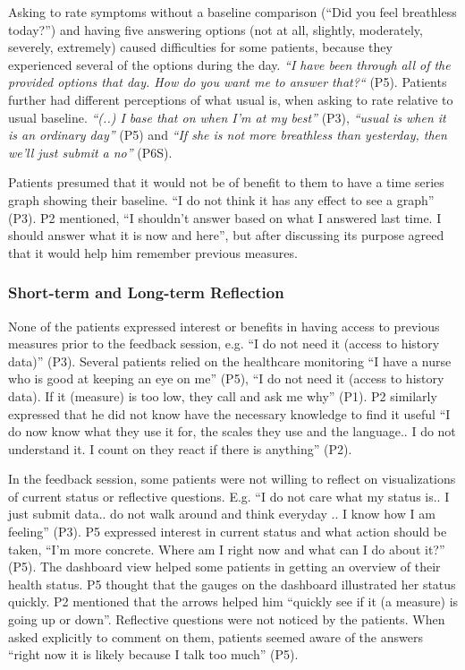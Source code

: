 Asking to rate symptoms without a baseline comparison (“Did you feel breathless today?”) and having five answering options (not at all, slightly, moderately, severely, extremely) caused difficulties for some patients, because they experienced several of the options during the day. \textit{“I have been through all of the provided options that day. How do you want me to answer that?“} (P5). Patients further had different perceptions of what usual is, when asking to rate relative to usual baseline. \textit{“(..) I base that on when I’m at my best”} (P3), \textit{“usual is when it is an ordinary day”} (P5) and \textit{“If she is not more breathless than yesterday, then we’ll just submit a no”} (P6S). 

Patients presumed that it would not be of benefit to them to have a time series graph showing their baseline. “I do not think it has any effect to see a graph” (P3). P2 mentioned, “I shouldn’t answer based on what I answered last time. I should answer what it is now and here”, but after discussing its purpose agreed that it would help him remember previous measures. 

\subsubsection{Short-term and Long-term Reflection}
None of the patients expressed interest or benefits in having access to previous measures prior to the feedback session, e.g. “I do not need it (access to history data)” (P3). Several patients relied on the healthcare monitoring “I have a nurse who is good at keeping an eye on me” (P5), “I do not need it (access to history data). If it (measure) is too low, they call and ask me why” (P1). P2 similarly expressed that he did not know have the necessary knowledge to find it useful “I do now know what they use it for, the scales they use and the language.. I do not understand it. I count on they react if there is anything” (P2). 

In the feedback session, some patients were not willing to reflect on visualizations of current status or reflective questions. E.g. “I do not care what my status is.. I just submit data.. do not walk around and think everyday .. I know how I am feeling” (P3). P5 expressed interest in current status and what action should be taken, “I’m more concrete. Where am I right now and what can I do about it?” (P5). The dashboard view helped some patients in getting an overview of their health status. P5 thought that the gauges on the dashboard illustrated her status quickly. P2 mentioned that the arrows helped him “quickly see if it (a measure) is going up or down”. Reflective questions were not noticed by the patients. When asked explicitly to comment on them, patients seemed aware of the answers “right now it is likely because I talk too much” (P5). 

